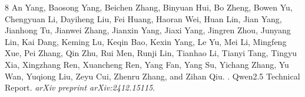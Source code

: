 \begin{thebibliography}{8}
An Yang, Baosong Yang, Beichen Zhang, Binyuan Hui, Bo Zheng, Bowen Yu, Chengyuan Li, Dayiheng Liu, Fei Huang, Haoran Wei, Huan Lin, Jian Yang, Jianhong Tu, Jianwei Zhang, Jianxin Yang, Jiaxi Yang, Jingren Zhou, Junyang Lin, Kai Dang, Keming Lu, Keqin Bao, Kexin Yang, Le Yu, Mei Li, Mingfeng Xue, Pei Zhang, Qin Zhu, Rui Men, Runji Lin, Tianhao Li, Tianyi Tang, Tingyu Xia, Xingzhang Ren, Xuancheng Ren, Yang Fan, Yang Su, Yichang Zhang, Yu Wan, Yuqiong Liu, Zeyu Cui, Zhenru Zhang, and Zihan Qiu.
.
\newblock Qwen2.5 Technical Report.
\newblock \emph{arXiv preprint arXiv:2412.15115}.
\end{thebibliography}
